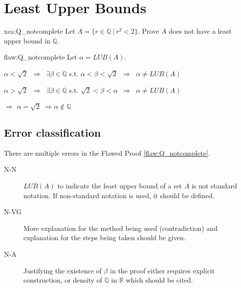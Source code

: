 \section{Least Upper Bounds}

\begin{xca}{xca:Q_notcomplete}
Let $A = \{r \in \mathbb{Q} \: | \: r^2 < 2\}$. Prove $A$ does not have a least upper bound in $\mathbb{Q}$.
\end{xca}

\begin{flaw}{flaw:Q_notcomplete} %
Let $\alpha = LUB(A)$.

\noindent $\alpha < \sqrt{2} $ $\:\Rightarrow\:$  $ \exists \beta \in \mathbb{Q}$ s.t. $\alpha < \beta < \sqrt{2}$ $\:\Rightarrow\: $ $\alpha \neq LUB(A)$

\noindent  $\alpha > \sqrt{2} \: $ $\Rightarrow$  $\: \exists \beta \in \mathbb{Q}$ s.t. $\sqrt{2} < \beta < \alpha$
$\:\Rightarrow\: $ $\alpha \neq LUB(A)$

\noindent  $\Rightarrow$ $\alpha = \sqrt{2}$ $\Rightarrow \alpha \notin \mathbb{Q}$

\end{flaw}

\clearpage
\subsection{Error classification}


There are multiple errors
 in the Flawed Proof \ref{flaw:Q_notcomplete}.

 \begin{description}
    \item[N-N] $LUB(A)$ to indicate the least upper bound of a set $A$ is not standard notation. If non-standard notation is used, it should be defined.
    \item[N-VG] More explanation for the method being used (contradiction) and explanation for the steps being taken should be given.
    \item[N-A] Justifying the existence of $\beta$ in the proof either requires explicit construction, or  density of $\mathbb{Q}$ in $\mathbb{R}$ which should be cited.

 	
 \end{description}


